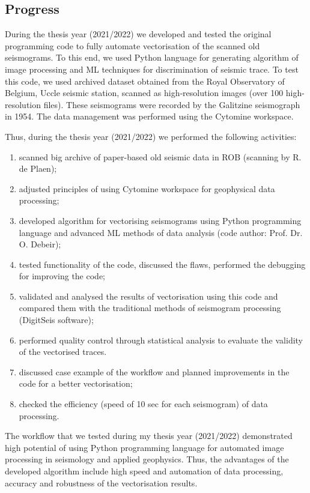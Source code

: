 \documentclass[a4paper,english,12pt]{article}
\begin{document}
\subsection{Progress}
During the  thesis year (2021/2022) we developed and tested the original programming code to fully automate vectorisation of the scanned old seismograms. To this end, we used Python language for generating algorithm of image processing and ML techniques for discrimination of seismic trace. To test this code, we used archived dataset obtained from the Royal Observatory of Belgium, Uccle seismic station, scanned as high‐resolution images (over 100 high-resolution files). These seismograms were recorded by the Galitzine seismograph in 1954. 
The data management was performed using the Cytomine workspace. 

Thus, during the  thesis year (2021/2022) we performed the following activities: 
\begin{enumerate}
	\item scanned big archive of paper-based old seismic data in ROB (scanning by R. de Plaen);
	\item adjusted principles of using Cytomine workspace for geophysical data processing;
	\item developed algorithm for vectorising seismograms using Python programming language and advanced ML methods of data analysis (code author: Prof. Dr. O. Debeir);
	\item tested functionality of the code, discussed the flaws, performed the debugging for improving the code;
	\item validated and analysed the results of vectorisation using this code and compared them with the traditional methods of seismogram processing (DigitSeis software);
	\item performed quality control through statistical analysis to evaluate the validity of the vectorised traces. 
	\item discussed case example of the workflow and planned improvements in the code for a better vectorisation;
	\item checked the efficiency (speed of 10 sec for each seismogram) of data processing.
\end{enumerate}
	The workflow that we tested during my  thesis year (2021/2022) demonstrated high potential of using Python programming language for automated image processing in seismology and applied geophysics. Thus, the advantages of the developed algorithm include high speed and automation of data processing, accuracy and robustness of the vectorisation results.
	
\end{document}
